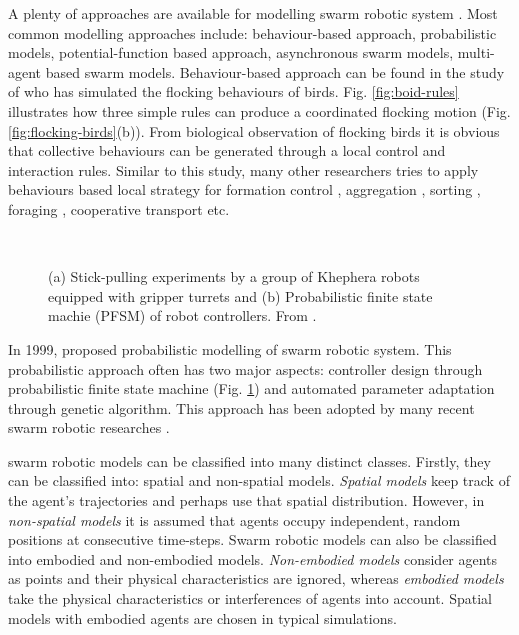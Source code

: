 A plenty of approaches are available for modelling swarm robotic system \cite{Gazi+2006}. Most common modelling approaches include: behaviour-based approach, probabilistic models, potential-function based approach, asynchronous swarm models, multi-agent based swarm models. Behaviour-based approach can be found in the study of  who has simulated the flocking behaviours of birds. Fig. \ref{fig:boid-rules} illustrates how three simple rules can produce a coordinated flocking motion (Fig. \ref{fig:flocking-birds}(b)). From biological observation of flocking birds  it is obvious that collective behaviours can be generated through a local control and interaction rules. Similar to this study, many other researchers tries to apply behaviours based local strategy for formation control \cite{Balch+1998}, aggregation \cite{Mataric1995}, sorting \cite{Melhuish+1998}, foraging \cite{Liu+2007}, cooperative transport \cite{Kube1997} etc.
\begin{figure}
\centering
{} 
\hspace{0.5cm}\\
\caption{ (a) Stick-pulling experiments by a group of Khephera robots equipped with gripper turrets and (b) Probabilistic finite state machie (PFSM) of robot controllers. From \protect{}.}
\label{fig:stick-pulling-expt}
\end{figure}

In 1999,  proposed probabilistic modelling of swarm robotic system. This probabilistic approach often has two major aspects: controller design through probabilistic finite state machine (Fig. \ref{fig:stick-pulling-expt}) and automated parameter adaptation through genetic algorithm. This approach has been adopted by many recent swarm robotic researches \cite{Agassounon+2004,Lerman+2005,Liu+2007b}.
 
swarm robotic models can be classified into many distinct classes. Firstly, they can be classified into: spatial and non-spatial models. {\em Spatial models} keep track of the agent's trajectories and perhaps use that spatial distribution. However, in {\em non-spatial models} it is assumed that agents occupy independent, random positions at consecutive time-steps. Swarm robotic models can also be classified into embodied and non-embodied models. {\em Non-embodied models} consider agents  as points and their physical characteristics are ignored, whereas {\em embodied models} take the physical characteristics or interferences of agents into account. Spatial models with embodied agents are chosen in typical simulations.

